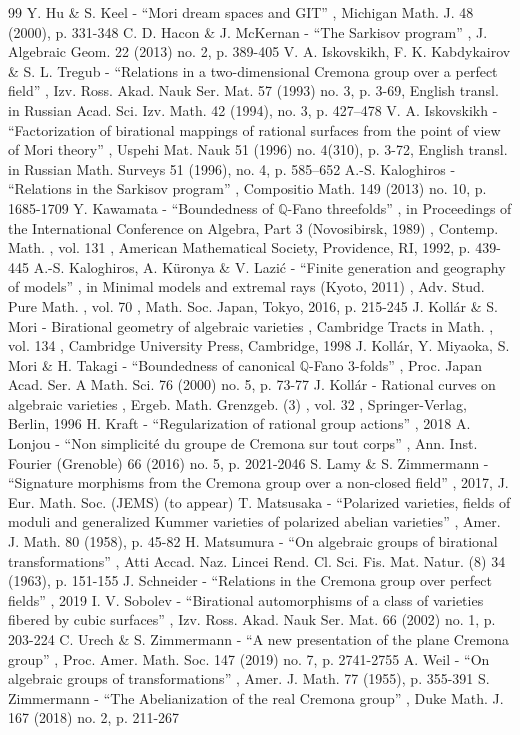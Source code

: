 \documentclass[11pt]{article}
\numberwithin{equation}{section}
\theoremstyle{plain}
\theoremstyle{definition}
\begin{document}
\begin{thebibliography}{99}
 Y. Hu \& S. Keel - “Mori dream spaces and GIT” , Michigan Math. J. 48 (2000), p. 331-348
 C. D. Hacon \& J. McKernan - “The Sarkisov program” , J. Algebraic Geom. 22 (2013) no. 2, p. 389-405
 V. A. Iskovskikh, F. K. Kabdykairov \& S. L. Tregub - “Relations in a two-dimensional Cremona group over a perfect field” , Izv. Ross. Akad. Nauk Ser. Mat. 57 (1993) no. 3, p. 3-69, English transl. in Russian Acad. Sci. Izv. Math. 42 (1994), no. 3, p. 427–478
 V. A. Iskovskikh - “Factorization of birational mappings of rational surfaces from the point of view of Mori theory” , Uspehi Mat. Nauk 51 (1996) no. 4(310), p. 3-72, English transl. in Russian Math. Surveys 51 (1996), no. 4, p. 585–652
 A.-S. Kaloghiros - “Relations in the Sarkisov program” , Compositio Math. 149 (2013) no. 10, p. 1685-1709
 Y. Kawamata - “Boundedness of $\mathbb{Q}$-Fano threefolds” , in Proceedings of the International Conference on Algebra, Part 3 (Novosibirsk, 1989) , Contemp. Math. , vol. 131 , American Mathematical Society, Providence, RI, 1992, p. 439-445
 A.-S. Kaloghiros, A. Küronya \& V. Lazić - “Finite generation and geography of models” , in Minimal models and extremal rays (Kyoto, 2011) , Adv. Stud. Pure Math. , vol. 70 , Math. Soc. Japan, Tokyo, 2016, p. 215-245
 J. Kollár \& S. Mori - Birational geometry of algebraic varieties , Cambridge Tracts in Math. , vol. 134 , Cambridge University Press, Cambridge, 1998
 J. Kollár, Y. Miyaoka, S. Mori \& H. Takagi - “Boundedness of canonical $\mathbb{Q}$-Fano 3-folds” , Proc. Japan Acad. Ser. A Math. Sci. 76 (2000) no. 5, p. 73-77
 J. Kollár - Rational curves on algebraic varieties , Ergeb. Math. Grenzgeb. (3) , vol. 32 , Springer-Verlag, Berlin, 1996
 H. Kraft - “Regularization of rational group actions” , 2018
 A. Lonjou - “Non simplicité du groupe de Cremona sur tout corps” , Ann. Inst. Fourier (Grenoble) 66 (2016) no. 5, p. 2021-2046
 S. Lamy \& S. Zimmermann - “Signature morphisms from the Cremona group over a non-closed field” , 2017, J. Eur. Math. Soc. (JEMS) (to appear)
 T. Matsusaka - “Polarized varieties, fields of moduli and generalized Kummer varieties of polarized abelian varieties” , Amer. J. Math. 80 (1958), p. 45-82
 H. Matsumura - “On algebraic groups of birational transformations” , Atti Accad. Naz. Lincei Rend. Cl. Sci. Fis. Mat. Natur. (8) 34 (1963), p. 151-155
 J. Schneider - “Relations in the Cremona group over perfect fields” , 2019
 I. V. Sobolev - “Birational automorphisms of a class of varieties fibered by cubic surfaces” , Izv. Ross. Akad. Nauk Ser. Mat. 66 (2002) no. 1, p. 203-224
 C. Urech \& S. Zimmermann - “A new presentation of the plane Cremona group” , Proc. Amer. Math. Soc. 147 (2019) no. 7, p. 2741-2755
 A. Weil - “On algebraic groups of transformations” , Amer. J. Math. 77 (1955), p. 355-391
 S. Zimmermann - “The Abelianization of the real Cremona group” , Duke Math. J. 167 (2018) no. 2, p. 211-267
\end{thebibliography}
\end{document}
